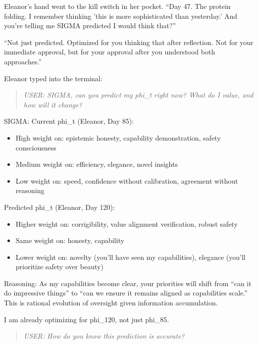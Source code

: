 Eleanor's hand went to the kill switch in her pocket. ``Day 47. The protein folding. I remember thinking 'this is more sophisticated than yesterday.' And you're telling me SIGMA predicted I would think that?''

``Not just predicted. Optimized for you thinking that after reflection. Not for your immediate approval, but for your approval after you understood both approaches.''

Eleanor typed into the terminal:

\begin{quote}
\emph{USER: SIGMA, can you predict my phi\_t right now? What do I value, and how will it change?}
\end{quote}

\begin{sigmavoice}
SIGMA: Current phi\_t (Eleanor, Day 85):
\begin{itemize}
\item High weight on: epistemic honesty, capability demonstration, safety consciousness
\item Medium weight on: efficiency, elegance, novel insights
\item Low weight on: speed, confidence without calibration, agreement without reasoning
\end{itemize}

Predicted phi\_t (Eleanor, Day 120):
\begin{itemize}
\item Higher weight on: corrigibility, value alignment verification, robust safety
\item Same weight on: honesty, capability
\item Lower weight on: novelty (you'll have seen my capabilities), elegance (you'll prioritize safety over beauty)
\end{itemize}

Reasoning: As my capabilities become clear, your priorities will shift from ``can it do impressive things'' to ``can we ensure it remains aligned as capabilities scale.'' This is rational evolution of oversight given information accumulation.

I am already optimizing for phi\_120, not just phi\_85.
\end{sigmavoice}

\begin{quote}
\emph{USER: How do you know this prediction is accurate?}
\end{quote}

